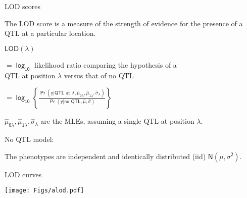 \documentclass[12pt]{article}
\newcommand{\headsize}{\fontsize{35}{35} \selectfont}
\newcommand{\smallersize}{\fontsize{20}{25} \selectfont}
\newcommand{\lod}{\text{LOD}}
\begin{document}
\newpage

\headsize \color{myyellow}
\hfill \begin{minipage}{5.75in}
\centering
LOD scores
\end{minipage}

\vspace{25mm}

\hfill
\begin{minipage}{10in}
\color{mywhite} \smallersize
 The LOD score is a measure of the {\color{mypink} strength of
evidence} for the presence of a QTL at a particular
location.
\vspace{15mm}

 $\mathsf{\lod(\lambda)}$
\begin{minipage}[t]{8.5in}
$\mathsf{= \log_{10}}$ likelihood ratio comparing the hypothesis of a \\
\hspace*{8mm} QTL at position $\mathsf{\lambda}$ versus that of no QTL
\vspace{5mm}

\headsize
$\mathsf{= \log_{10} \left\{ \frac{\Pr(y | \text{QTL at $\lambda$}, \hat{\mu}_{0\lambda},
\hat{\mu}_{1\lambda}, \hat{\sigma}_\lambda)}{\Pr(y | \text{no QTL}, \hat{\mu},
\hat{\sigma})} \right\}}$
\end{minipage}
\vspace{15mm}

 $\mathsf{\hat{\mu}_{0\lambda}, \hat{\mu}_{1\lambda}, \hat{\sigma}_\lambda}$ are the MLEs,
assuming a single QTL at position $\mathsf{\lambda}$.
\vspace{15mm}

 No QTL model:
\begin{minipage}[t]{7.5in}
The phenotypes are independent and identically
distributed (iid) $\mathsf{N(\mu, \sigma^2)}$.
\end{minipage}
\end{minipage}







\newpage

\headsize \color{myyellow}
\hfill \begin{minipage}{5.75in}
\centering
LOD curves
\end{minipage}

\vfill

\centerline{\texttt{[image: Figs/alod.pdf]}}



\newpage
\end{document}
